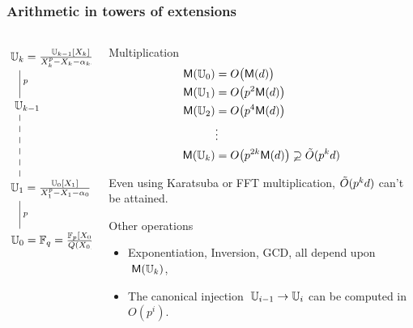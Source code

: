 \documentclass[10pt,usepdftitle=false]{beamer}
\begin{document}
\begin{frame}
  \frametitle{Arithmetic in towers of extensions}
  
  \begin{columns}
    \begin{column}{0.3\textwidth}
      \Large\[\xymatrix{
        *+[r]{\U_k = \frac{\U_{k-1}[X_k]}{X_k^p-X_k-\alpha_{k-1}}}\ar@{-}[d]^p\\
        *+[r]{\U_{k-1}} \ar@{--}[dd]\\
        \\
        *+[r]{\U_{1} = \frac{\U_0[X_1]}{X_1^p-X_1-\alpha_0}} \ar@{-}[d]^p\\
        *+[r]{\U_{0} = \F_q = \frac{\F_p[X_0]}{Q(X_0)}}
      }\]
    \end{column}
    \begin{column}{0.65\textwidth}
      \begin{block}{Multiplication}
        \vspace{-\baselineskip}
        \begin{align*}
          \mathsf{M}(\mathbb{U}_0) &= O\bigl(\mathsf{M}(d)\bigr)\\
          \mathsf{M}(\mathbb{U}_1) &= O\bigl(p^2\mathsf{M}(d)\bigr)\\
          \mathsf{M}(\mathbb{U}_2) &= O\bigl(p^4\mathsf{M}(d)\bigr)\\
          &\vdots\\
          \mathsf{M}(\mathbb{U}_k) &= O\bigl(p^{2k}\mathsf{M}(d)\bigr) \varsupsetneq \tilde{O}(p^kd)
        \end{align*}
        
        Even using Karatsuba or FFT multiplication, $\tilde{O}(p^kd)$
        can't be attained.
      \end{block}
      \vspace{-1.5mm}
      \begin{block}{Other operations}
        \begin{itemize}
        \item Exponentiation, Inversion, GCD, all depend upon $\;\mathsf{M}(\mathbb{U}_k)$,
        \item The canonical injection $\;\mathbb{U}_{i-1}\rightarrow\mathbb{U}_i$ can be computed in $O(p^i)$.
        \end{itemize}
      \end{block}
    \end{column}
  \end{columns}
\end{frame}

\end{document}
